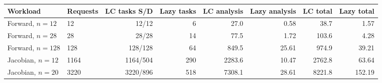 \begin{tabular}{llrrrrrr}
\toprule
Workload & Requests & LC tasks S/D & Lazy tasks & LC analysis & Lazy analysis & LC total & Lazy total\\
\midrule
Forward, $n=12$ & 12 & 12/12 & 6 & 27.0 & 0.58 & 38.7 & 1.57\\
Forward, $n=28$ & 28 & 28/28 & 14 & 77.5 & 1.72 & 103.6 & 4.28\\
Forward, $n=128$ & 128 & 128/128 & 64 & 849.5 & 25.61 & 974.9 & 39.21\\
Jacobian, $n=12$ & 1164 & 1164/504 & 290 & 2283.6 & 10.47 & 2762.8 & 63.64\\
Jacobian, $n=20$ & 3220 & 3220/896 & 518 & 7308.1 & 28.61 & 8221.8 & 152.19\\
\bottomrule
\end{tabular}
